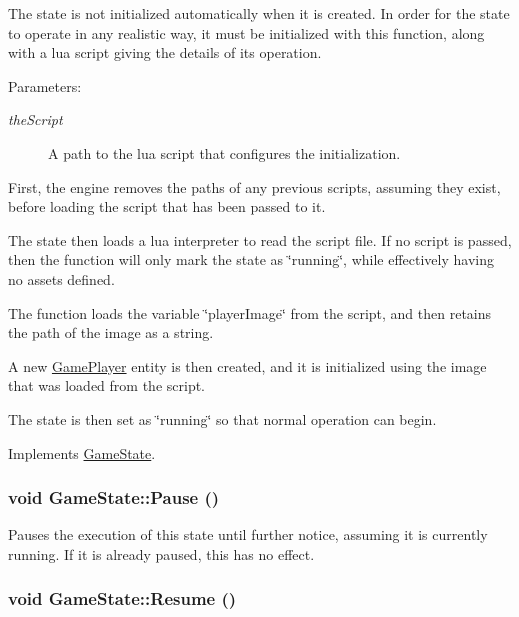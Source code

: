 The state is not initialized automatically when it is created. In order for the state to operate in any realistic way, it must be initialized with this function, along with a lua script giving the details of its operation.

\begin{Desc}
\item[Parameters:]
\begin{description}
\item[{\em theScript}]A path to the lua script that configures the initialization. \end{description}
\end{Desc}


First, the engine removes the paths of any previous scripts, assuming they exist, before loading the script that has been passed to it.

The state then loads a lua interpreter to read the script file. If no script is passed, then the function will only mark the state as \char`\"{}running\char`\"{}, while effectively having no assets defined.

The function loads the variable \char`\"{}playerImage\char`\"{} from the script, and then retains the path of the image as a string.

A new \hyperlink{class_game_player}{GamePlayer} entity is then created, and it is initialized using the image that was loaded from the script.

The state is then set as \char`\"{}running\char`\"{} so that normal operation can begin.

Implements \hyperlink{class_game_state_488fd39ceb2907b13e11f03607f16e5f}{GameState}.\hypertarget{class_game_state_0c47c6969a4e0bb32d6cdf7bf9376817}{
\subsubsection[{Pause}]{\setlength{\rightskip}{0pt plus 5cm}void GameState::Pause ()}}
\label{dd/d87/class_game_state_0c47c6969a4e0bb32d6cdf7bf9376817}


Pauses the execution of this state until further notice, assuming it is currently running. If it is already paused, this has no effect. \hypertarget{class_game_state_d12ece3c3fb066281b73b07a315f04e8}{
\subsubsection[{Resume}]{\setlength{\rightskip}{0pt plus 5cm}void GameState::Resume ()}}
\label{dd/d87/class_game_state_d12ece3c3fb066281b73b07a315f04e8}


